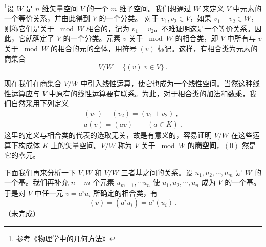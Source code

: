 
\begin{issues}
\issueDraft
\end{issues}


\footnote{参考《物理学中的几何方法》}设 $W$ 是 $n$ 维矢量空间 $V$ 的一个 $m$ 维子空间。我们想通过 $W$ 来定义 $V$ 中元素的一个等价关系，并由此得到 $V$ 的一个分类。
对于 $v_1,v_2\in V$，如果 $v_1-v_2\in W$，则称它们是关于 $\bmod W $ 相合的，记为 $v_1=v_2$。不难证明这是一个等价关系。因此，它就确定了 $V $ 的一个分类。元素 $v $ 关于 $\bmod W $ 的相合类，即 $V $ 中所有与 $v $ 关于 $\bmod W $ 的相合的元的全体，用符号 $(v) $ 标记。这样，有相合类为元素的商集合
\begin{equation}
V / W=\{(v) | v \in V\}~.
\end{equation}

现在我们在商集合 $V/W $ 中引入线性运算，使它也成为一个线性空间。当然这种线性运算应与 $V $ 中原有的线性运算要有联系。为此，对于相合类的加法和数乘，我们自然采用下列定义
\begin{equation}
\begin{array}{l}\left(v_{1}\right)+\left(v_{2}\right)=\left(v_{1}+v_{2}\right)~, \\ a(v)=(a v)\qquad (a \in K)~.
\end{array}
\end{equation}
这里的定义与相合类的代表的选取无关，故是有意义的，容易证明 $V/W $ 在这些运算下构成体 $K $ 上的矢量空间。$V/W $ 称为 $V $ 关于 $\bmod W$ 的\textbf{商空间}，$(0)$ 然是它的零元。

下面我们再来分析一下 $V,W$ 和 $V/W $ 三者基之间的关系。设 $u_1,u_2,\cdots,u_m$ 是 $W $ 的一个基。我们再补充 $n- m$ 个元素 ${u}_{m+1}, \cdots {u}_{n}$ 使 $u_{1}, u_{2}, \cdots, u_{n}$ 成为 $V$ 的一个基。于是对 $V $ 中任一元 $v=a^iu_i$ 所确定的相合类，有
\begin{equation}
(v)=\left(a^{i} u_{i}\right)=a^{i}\left(u_{i}\right)~.
\end{equation}
（未完成）
